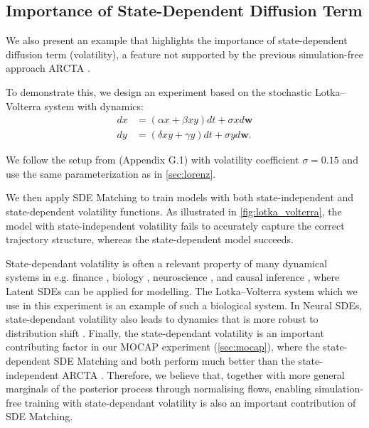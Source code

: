 \documentclass{article}
\def\w{\mathbf{w}}
\def\a{\alpha}
\def\s{\sigma}
\theoremstyle{plain}
\theoremstyle{definition}
\theoremstyle{remark}
\begin{document}
\subsection{Importance of State-Dependent Diffusion Term}
\label{app:diffusion_term}


We also present an example that highlights the importance of state-dependent diffusion term (volatility), a feature not supported by the previous simulation-free approach ARCTA \citep{course2024amortized}.


To demonstrate this, we design an experiment based on the stochastic Lotka–Volterra system with dynamics:
\begin{align}
    d x &= (\a x + \beta x y ) dt + \s x d \w \\
    d y &= (\delta xy + \gamma y ) dt + \s y d \w.
\end{align}

We follow the setup from \citet{course2024amortized} (Appendix G.1) with volatility coefficient $\sigma = 0.15$ and use the same parameterization as in \cref{sec:lorenz}.

We then apply SDE Matching to train models with both state-independent and state-dependent volatility functions. As illustrated in \cref{fig:lotka_volterra}, the model with state-independent volatility fails to accurately capture the correct trajectory structure, whereas the state-dependent model succeeds.

State-dependant volatility is often a relevant property of many dynamical systems in e.g. finance \citep{oksendal2003stochastic}, biology \citep{vadillo2019comparing}, neuroscience \citep{elgazzar2024generative}, and causal inference \cite{peters2022causal}, where Latent SDEs can be applied for modelling. The Lotka–Volterra system which we use in this experiment is an example of such a biological system. In Neural SDEs, state-dependant volatility also leads to dynamics that is more robust to distribution shift \citep{oh2024stable}. Finally, the state-dependant volatility is an important contributing factor in our MOCAP experiment (\cref{sec:mocap}), where the state-dependent SDE Matching and \citet{li2020scalable} both perform much better than the state-independent ARCTA \citep{course2024amortized}. Therefore, we believe that, together with more general marginals of the posterior process through normalising flows, enabling simulation-free training with state-dependant volatility is also an important contribution of SDE Matching.
\end{document}
